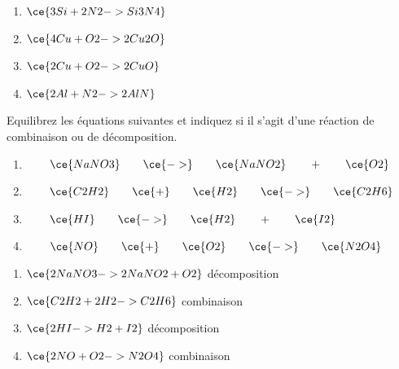 \documentclass[
  11pt,
  french,
  a4paper,
  openany]{book}
\begin{document}
\begin{Answer}

\begin{enumerate}
\def\labelenumi{\arabic{enumi}.}
\item
  \(\ce{ 3Si + 2N2 -> Si3N4}\)
\item
  \(\ce{ 4Cu + O2 -> 2Cu2O}\)
\item
  \(\ce{ 2Cu + O2 -> 2CuO}\)
\item
  \(\ce{ 2Al + N2 -> 2AlN}\)
\end{enumerate}


\end{Answer}

\begin{Exercise}

Equilibrez les équations suivantes et indiquez si il s'agit d'une réaction de combinaison ou de décomposition.

\begin{enumerate}
\def\labelenumi{\arabic{enumi}.}
\item
  \(\qquad \ce{NaNO3} \qquad \ce{->} \qquad \ce{NaNO2} \qquad + \qquad \ce{O2}\)
\item
  \(\qquad \ce{C2H2} \qquad \ce{+} \qquad \ce{H2} \qquad \ce{->} \qquad \ce{C2H6}\)
\item
  \(\qquad \ce{HI} \qquad \ce{->} \qquad \ce{H2} \qquad + \qquad \ce{I2}\)
\item
  \(\qquad \ce{NO} \qquad \ce{+} \qquad \ce{O2} \qquad \ce{->} \qquad \ce{N2O4}\)
\end{enumerate}


\end{Exercise}

\begin{Answer}

\begin{enumerate}
\def\labelenumi{\arabic{enumi}.}
\item
  \(\ce{2NaNO3 -> 2NaNO2 + O2}\) décomposition
\item
  \(\ce{C2H2 + 2H2 -> C2H6}\) combinaison
\item
  \(\ce{2HI -> H2 + I2}\) décomposition
\item
  \(\ce{2NO + O2 -> N2O4}\) combinaison
\end{enumerate}


\end{Answer}
\end{document}
